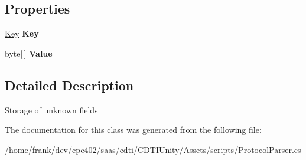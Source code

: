 \subsection*{Properties}
\begin{DoxyCompactItemize}
\item 
\hypertarget{class_silent_orbit_1_1_protocol_buffers_1_1_key_value_a041f3d9740a6df457ea3c74d2b024b7f}{}\hyperlink{class_silent_orbit_1_1_protocol_buffers_1_1_key}{Key} {\bfseries Key}\label{class_silent_orbit_1_1_protocol_buffers_1_1_key_value_a041f3d9740a6df457ea3c74d2b024b7f}

\item 
\hypertarget{class_silent_orbit_1_1_protocol_buffers_1_1_key_value_a358b40d160e891e8cdd9039d86469f60}{}byte\mbox{[}$\,$\mbox{]} {\bfseries Value}\label{class_silent_orbit_1_1_protocol_buffers_1_1_key_value_a358b40d160e891e8cdd9039d86469f60}

\end{DoxyCompactItemize}


\subsection{Detailed Description}
Storage of unknown fields 



The documentation for this class was generated from the following file\+:\begin{DoxyCompactItemize}
\item 
/home/frank/dev/cpe402/saas/cdti/\+C\+D\+T\+I\+Unity/\+Assets/scripts/Protocol\+Parser.\+cs\end{DoxyCompactItemize}
